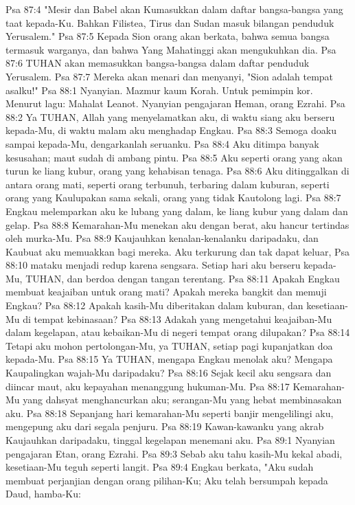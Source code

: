 Psa 87:4  "Mesir dan Babel akan Kumasukkan dalam daftar bangsa-bangsa yang taat kepada-Ku. Bahkan Filistea, Tirus dan Sudan masuk bilangan penduduk Yerusalem."
Psa 87:5  Kepada Sion orang akan berkata, bahwa semua bangsa termasuk warganya, dan bahwa Yang Mahatinggi akan mengukuhkan dia.
Psa 87:6  TUHAN akan memasukkan bangsa-bangsa dalam daftar penduduk Yerusalem.
Psa 87:7  Mereka akan menari dan menyanyi, "Sion adalah tempat asalku!"
Psa 88:1  Nyanyian. Mazmur kaum Korah. Untuk pemimpin kor. Menurut lagu: Mahalat Leanot. Nyanyian pengajaran Heman, orang Ezrahi.
Psa 88:2  Ya TUHAN, Allah yang menyelamatkan aku, di waktu siang aku berseru kepada-Mu, di waktu malam aku menghadap Engkau.
Psa 88:3  Semoga doaku sampai kepada-Mu, dengarkanlah seruanku.
Psa 88:4  Aku ditimpa banyak kesusahan; maut sudah di ambang pintu.
Psa 88:5  Aku seperti orang yang akan turun ke liang kubur, orang yang kehabisan tenaga.
Psa 88:6  Aku ditinggalkan di antara orang mati, seperti orang terbunuh, terbaring dalam kuburan, seperti orang yang Kaulupakan sama sekali, orang yang tidak Kautolong lagi.
Psa 88:7  Engkau melemparkan aku ke lubang yang dalam, ke liang kubur yang dalam dan gelap.
Psa 88:8  Kemarahan-Mu menekan aku dengan berat, aku hancur tertindas oleh murka-Mu.
Psa 88:9  Kaujauhkan kenalan-kenalanku daripadaku, dan Kaubuat aku memuakkan bagi mereka. Aku terkurung dan tak dapat keluar,
Psa 88:10  mataku menjadi redup karena sengsara. Setiap hari aku berseru kepada-Mu, TUHAN, dan berdoa dengan tangan terentang.
Psa 88:11  Apakah Engkau membuat keajaiban untuk orang mati? Apakah mereka bangkit dan memuji Engkau?
Psa 88:12  Apakah kasih-Mu diberitakan dalam kuburan, dan kesetiaan-Mu di tempat kebinasaan?
Psa 88:13  Adakah yang mengetahui keajaiban-Mu dalam kegelapan, atau kebaikan-Mu di negeri tempat orang dilupakan?
Psa 88:14  Tetapi aku mohon pertolongan-Mu, ya TUHAN, setiap pagi kupanjatkan doa kepada-Mu.
Psa 88:15  Ya TUHAN, mengapa Engkau menolak aku? Mengapa Kaupalingkan wajah-Mu daripadaku?
Psa 88:16  Sejak kecil aku sengsara dan diincar maut, aku kepayahan menanggung hukuman-Mu.
Psa 88:17  Kemarahan-Mu yang dahsyat menghancurkan aku; serangan-Mu yang hebat membinasakan aku.
Psa 88:18  Sepanjang hari kemarahan-Mu seperti banjir mengelilingi aku, mengepung aku dari segala penjuru.
Psa 88:19  Kawan-kawanku yang akrab Kaujauhkan daripadaku, tinggal kegelapan menemani aku.
Psa 89:1  Nyanyian pengajaran Etan, orang Ezrahi.
Psa 89:3  Sebab aku tahu kasih-Mu kekal abadi, kesetiaan-Mu teguh seperti langit.
Psa 89:4  Engkau berkata, "Aku sudah membuat perjanjian dengan orang pilihan-Ku; Aku telah bersumpah kepada Daud, hamba-Ku:
